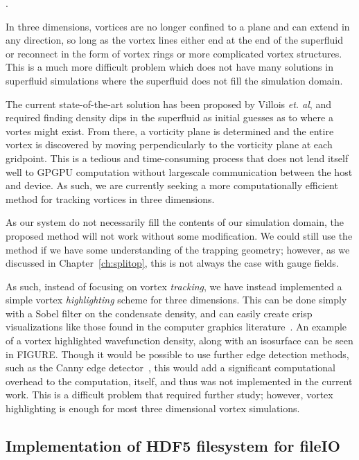 .

In three dimensions, vortices are no longer confined to a plane and can extend in any direction, so long as the vortex lines either end at the end of the superfluid or reconnect in the form of vortex rings or more complicated vortex structures.
This is a much more difficult problem which does not have many solutions in superfluid simulations where the superfluid does not fill the simulation domain.

The current state-of-the-art solution has been proposed by Villois \textit{et. al}, and required finding density dips in the superfluid as initial guesses as to where a vortes might exist.
From there, a vorticity plane is determined and the entire vortex is discovered by moving perpendicularly to the vorticity plane at each gridpoint.
This is a tedious and time-consuming process that does not lend itself well to GPGPU computation without largescale communication between the host and device.
As such, we are currently seeking a more computationally efficient method for tracking vortices in three dimensions.

As our system do not necessarily fill the contents of our simulation domain, the proposed method will not work without some modification.
We could still use the method if we have some understanding of the trapping geometry; however, as we discussed in Chapter~\ref{ch:splitop}, this is not always the case with gauge fields.

As such, instead of focusing on vortex \textit{tracking}, we have instead implemented a simple vortex \textit{highlighting} scheme for three dimensions.
This can be done simply with a Sobel filter on the condensate density, and can easily create crisp visualizations like those found in the computer graphics literature~\cite{guo2018}.
An example of a vortex highlighted wavefunction density, along with an isosurface can be seen in FIGURE.
Though it would be possible to use further edge detection methods, such as the Canny edge detector~\cite{canny1986}, this would add a significant computational overhead to the computation, itself, and thus was not implemented in the current work.
This is a difficult problem that required further study; however, vortex highlighting is enough for most three dimensional vortex simulations.

\subsection{Implementation of HDF5 filesystem for fileIO}

